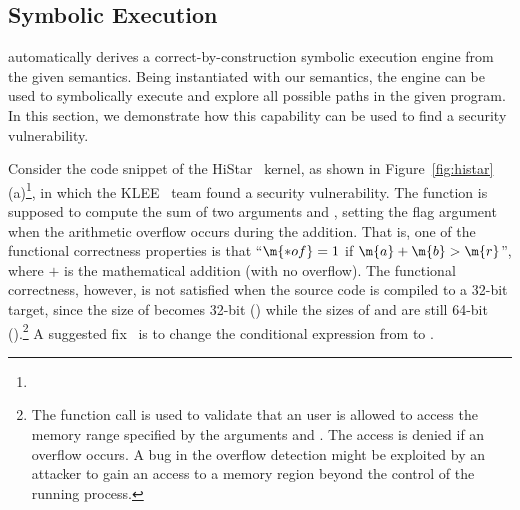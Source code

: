 \subsection{Symbolic Execution}
\label{sec:Appl:Security}

\K automatically derives a correct-by-construction symbolic execution engine from the given semantics.
Being instantiated with our semantics, the engine can be used to symbolically execute and explore all possible paths in the given \ISA program.
In this section, we demonstrate how this capability can be used to find a  security vulnerability.



Consider the code snippet of the HiStar~\cite{HiStar:2006} kernel, as shown in Figure~\ref{fig:histar}(a)\footnote{}, in which the KLEE~\cite{Cadar:2008} team found a security vulnerability.
The  function is supposed to compute the sum of two arguments  and , setting the flag argument  when the arithmetic overflow occurs during the addition.
That is, one of the functional correctness properties is that ``$\m{*of} = 1$ if $\m{a} + \m{b} > \m{r}$'', where $+$ is the mathematical addition (with no overflow).
The functional correctness, however, is not satisfied when the source code is compiled to a 32-bit target,
since the size of  becomes 32-bit () while the sizes of  and  are still 64-bit ().\footnote{The function call  is used to validate that an user is allowed to access the memory range specified by the arguments  and .
The access is denied if an overflow occurs.
A bug in the overflow detection might be exploited by an attacker to gain an access to a memory region beyond the control of the running process.}
A suggested fix~\cite{Cadar:2008} is to change the conditional expression from  to .

